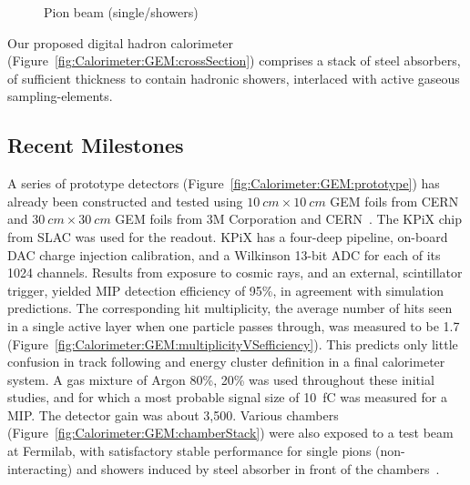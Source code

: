 \begin{figure}
\begin{minipage}{.33\textwidth}
		\caption{Pion beam (single/showers)}
		\label{fig:Calorimeter:GEM:pionBeam}
	\end{minipage}
\end{figure}
Our proposed digital hadron calorimeter (Figure~\ref{fig:Calorimeter:GEM:crossSection}) comprises a stack of steel absorbers, of sufficient thickness to contain hadronic showers, interlaced with active gaseous sampling-elements.

\subsection{Recent Milestones}
A series of prototype detectors (Figure~\ref{fig:Calorimeter:GEM:prototype}) has already been constructed and tested using $\SI{10}{cm} \times \SI{10}{cm}$ GEM foils from CERN and $\SI{30}{cm} \times \SI{30}{cm}$ GEM foils from 3M Corporation and CERN~\cite{1742-6596-404-1-012031}. The KPiX chip from SLAC was used for the readout. KPiX has a four-deep pipeline, on-board DAC charge injection calibration, and a Wilkinson 13-bit ADC for each of its 1024 channels. Results from exposure to cosmic rays, and an external, scintillator trigger, yielded MIP detection efficiency of 95\%, in agreement with simulation predictions. The corresponding hit multiplicity, the average number of hits seen in a single active layer when one particle passes through, was measured to be 1.7 (Figure~\ref{fig:Calorimeter:GEM:multiplicityVSefficiency}).
This predicts only little confusion in track following and energy cluster definition in a final calorimeter system. A gas mixture of Argon 80\%,  20\% was used throughout these initial studies, and for which a most probable signal size of \SI{10}{fC} was measured for a MIP. The detector gain was about 3,500. Various chambers (Figure~\ref{fig:Calorimeter:GEM:chamberStack}) were also exposed to a test beam at Fermilab, with satisfactory stable performance for single pions (non-interacting) and showers induced by steel absorber in front of the chambers~\cite{White:GEM:SiDWS2015}.
